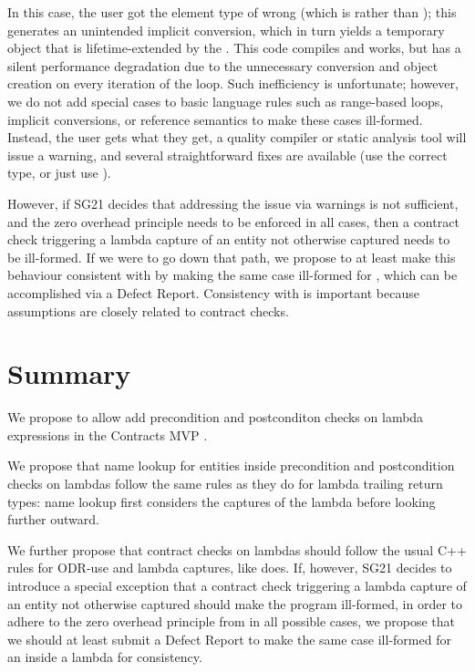 In this case, the user got the element type of  wrong (which is  rather than ); this generates an unintended implicit conversion, which in turn yields a temporary object that is lifetime-extended by the . This code compiles and works, but has a silent performance degradation due to the unnecessary conversion and object creation on every iteration of the loop. Such inefficiency is unfortunate; however, we do not add special cases to basic language rules such as range-based  loops, implicit conversions, or reference semantics to make these cases ill-formed. Instead, the user gets what they get, a quality compiler or static analysis tool will issue a warning, and several straightforward fixes are available (use the correct type, or just use ).

However, if SG21 decides that addressing the issue via warnings is not sufficient, and the zero overhead principle needs to be enforced in all cases, then a contract check triggering a lambda capture of an entity not otherwise captured needs to be ill-formed. If we were to go down that path, we propose to at least make this behaviour consistent with \tcode{[[assume]]} by making the same case ill-formed for \tcode{[[assume]]}, which can be accomplished via a Defect Report. Consistency with \tcode{[[assume]]} is important because assumptions are closely related to contract checks.

\section{Summary}

We propose to allow add precondition and postconditon checks on lambda expressions in the Contracts MVP \cite{P2900R1}.

We propose that name lookup for entities inside precondition and postcondition checks on lambdas follow the same rules as they do for lambda trailing return types: name lookup first considers the captures of the lambda before looking further outward.

We further propose that contract checks on lambdas should follow the usual C++ rules for ODR-use and lambda captures, like \tcode{[[assume]]} does. If, however, SG21 decides to introduce a special exception that a contract check triggering a lambda capture of an entity not otherwise captured should make the program ill-formed, in order to adhere to the zero overhead principle from \cite{P2932R1} in all possible cases, we propose that we should at least submit a Defect Report to make the same case ill-formed for an \tcode{[[assume]]} inside a lambda for consistency.

